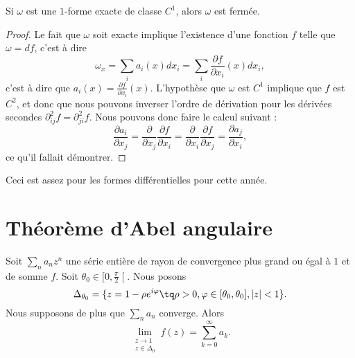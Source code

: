 \begin{proposition}
	Si $\omega$ est une $1$-forme exacte de classe $C^1$, alors $\omega$ est fermée.
\end{proposition}

\begin{proof}
	Le fait que $\omega$ soit exacte implique l'existence d'une fonction $f$ telle que $\omega=df$, c'est à dire
	\begin{equation}
		\omega_x=\sum_i a_i(x)dx_i=\sum_i\frac{ \partial f }{ \partial x_i }(x)dx_i,
	\end{equation}
	c'est à dire que $a_i(x)=\frac{ \partial f }{ \partial x_i }(x)$. L'hypothèse que $\omega$ est $C^1$ implique que $f$ est $C^2$, et donc que nous pouvons inverser l'ordre de dérivation pour les dérivées secondes $\partial^2_{ij}f=\partial^2_{ji}f$. Nous pouvons donc faire le calcul suivant :
	\begin{equation}
		\frac{ \partial a_i }{ \partial x_j }=\frac{ \partial  }{ \partial x_j }\frac{ \partial f }{ \partial x_i }=\frac{ \partial  }{ \partial x_i }\frac{ \partial f }{ \partial x_j }=\frac{ \partial a_j }{ \partial x_i },
	\end{equation}
	ce qu'il fallait démontrer.
\end{proof}

Ceci est assez pour les formes différentielles pour cette année.

\section{Théorème d'Abel angulaire}

\begin{theorem}   \label{ThoTGjmeen}
    Soit \( \sum_{n}a_nz^n\) une série entière de rayon de convergence plus grand ou égal à \( 1\) et de somme \( f\). Soit \( \theta_0\in\mathopen[ 0 , \frac{ \pi }{2} \mathclose[\). Nous posons
    \begin{equation}
        \Delta_{\theta_0}=\{ z=1-\rho e^{i\varphi}\tq \rho>0,\varphi\in\mathopen[ \theta_0 , \theta_0 \mathclose],| z |<1 \}.
    \end{equation}
    Nous supposons de plus que \( \sum_na_n\) converge. Alors
    \begin{equation}
        \lim_{\substack{z\to1\\z\in\Delta_0}}f(z)=\sum_{k=0}^{\infty}a_k.
    \end{equation}
\end{theorem}

